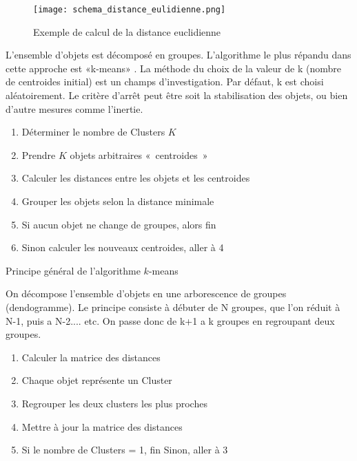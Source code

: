 \documentclass[a4paper,14pt]{article}
\begin{document}
        \begin{figure}[h]
            \centering
            \texttt{[image: schema\_distance\_eulidienne.png]}
            \caption{Exemple de calcul de la distance euclidienne}
            \label{fig:distance_eulidienne}
        \end{figure}


        L'ensemble d'objets est décomposé en groupes. L’algorithme le plus répandu
        dans cette approche est «k-means» . La méthode du choix de la
        valeur de k (nombre de centroides initial) est un champs d’investigation. Par
        défaut, k est choisi aléatoirement. Le critère d’arrêt peut être soit la stabilisation
        des objets, ou bien d’autre mesures comme l’inertie. \\


        \begin{enumerate}[leftmargin=*]
            \item Déterminer le nombre de Clusters \( K\)
            \item Prendre \( K \) objets arbitraires «~centroides~»
            \item Calculer les distances entre les objets et les centroides
            \item Grouper les objets selon la distance minimale
            \item Si aucun objet ne change de groupes, alors fin
            \item Sinon calculer les nouveaux centroides, aller à 4
        \end{enumerate}
        
        Principe général de l’algorithme \( k \)-means

        On décompose l'ensemble d'objets en une arborescence de groupes
        (dendogramme). Le principe consiste à débuter de N groupes, que l'on réduit à
        N-1, puis a N-2.... etc. On passe donc de k+1 a k groupes en regroupant deux
        groupes. 
        \\
        \begin{enumerate}[leftmargin=*]
            \item Calculer la matrice des distances
            \item Chaque objet représente un Cluster
            \item Regrouper les deux clusters les plus proches
            \item Mettre à jour la matrice des distances
            \item Si le nombre de Clusters = 1, fin Sinon, aller à 3
          \end{enumerate}
        
\end{document}
